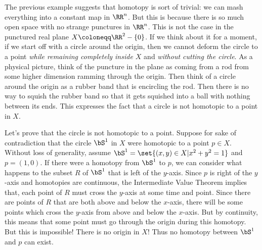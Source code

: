 \documentclass{axolotl}
\begin{document}
The previous example suggests that homotopy is sort of trivial: we can mash
everything into a constant map in \(\RR^n\). But this is because there is so
much open space with no strange punctures in \(\RR^n\). This is not the case in
the punctured real plane \(X \coloneqq \RR^2 - \{0\}\). If we think about it for
a moment, if we start off with a circle around the origin, then we cannot deform
the circle to a point \textit{while remaining completely inside \(X\)} and
\textit{without cutting the circle}. As a physical picture, think of the
puncture in the plane as coming from a rod from some higher dimension ramming
through the origin. Then think of a circle around the origin as a rubber band
that is encircling the rod. Then there is no way to squish the rubber band so
that it gets squished into a ball with nothing between its ends. This expresses
the fact that a circle is not homotopic to a point in \(X\).

Let's prove that the circle is not homotopic to a point. Suppose for sake of
contradiction that the circle \(\bS^1\) in \(X\) were homotopic to a point \(p
  \in X\). Without loss of generality, assume \(\bS^1 = \set{(x,y) \in X | x^2
    + y^2 = 1}\) and \(p = (1,0)\). If there were a homotopy from \(\bS^1\) to
\(p\), we can consider what happens to the subset \(R\) of \(\bS^1\) that is
left of the \(y\)-axis. Since \(p\) is right of the \(y\)-axis and homotopies
are continuous, the Intermediate Value Theorem implies that, each point of
\(R\) must cross the \(y\)-axis at some time and point. Since there are points
of \(R\) that are both above and below the \(x\)-axis, there will be some
points which cross the \(y\)-axis from above and below the \(x\)-axis. But by
continuity, this means that some point must go through the origin during this
homotopy. But this is impossible! There is no origin in \(X\)! Thus no homotopy
between \(\bS^1\) and \(p\) can exist.
\end{document}

